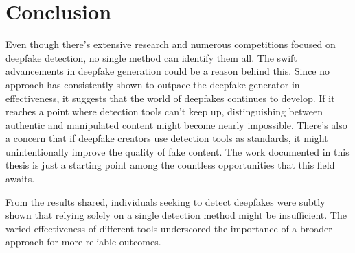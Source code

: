 \section{Conclusion}
Even though there's extensive research and numerous competitions focused on deepfake
detection, no single method can identify them all. The swift advancements in
deepfake generation could be a reason behind this. Since no approach has consistently
shown to outpace the deepfake generator in effectiveness, it suggests that the world
of deepfakes continues to develop. If it reaches a point where detection tools can't
keep up, distinguishing between authentic and manipulated content might become
nearly impossible. There's also a concern that if deepfake creators use detection
tools as standards, it might unintentionally improve the quality of fake content.
The work documented in this thesis is just a starting point among the countless
opportunities that this field awaits.


From the results shared, individuals seeking to detect deepfakes were subtly shown
that relying solely on a single detection method might be insufficient. The varied
effectiveness of different tools underscored the importance of a broader approach
for more reliable outcomes.
